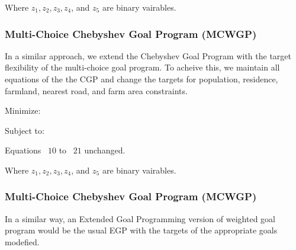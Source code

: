 Where $ z_1, z_2, z_3, z_4$, and $z_5$ are binary vairables.

\subsubsection{Multi-Choice Chebyshev Goal Program (MCWGP)}
In a similar approach, we extend the Chebyshev Goal Program with the target flexibility of the multi-choice goal program. To acheive this, we maintain all equations of the the CGP and change the targets for population, residence, farmland, nearest road, and farm area constraints.

Minimize:
              \EqCGPMinFunctionSix

Subject to:
                
              \EqMCWGPPopulationConstraintFourtyTwo   
              \EqMCWGPResidenceConstraintFourtyThree
              \EqMCWGPFarmlandDistanceConstraintFourtyFour
              \EqMCWGPNearestRoadConstraintFourtyFive
              \EqMCWGPFarmlandAreaConstraintFourtySix
              \begin{center}
                      Equations ~$10$ to ~$21$ unchanged.
              \end{center}
              \EqSelectThreeDamsTwentyTwo
              \EqBudgetConstraintTwentyThree
              \EqDConstraintOneNTwentyFour
              \EqDConstraintTwoNTwentyFive
              \EqDConstraintThreeNTwentySix
              \EqDConstraintFourNTwentySix
              \EqDConstraintFiveNTwentySeven
              \EqDConstraintSixNTwentyEight
              \EqDConstraintSevenNTwentyNine
              \EqDConstraintEightNThirty
              \EqDConstraintNineNThirtyOne
              \EqDConstraintTenNThirtyTwo

Where $ z_1, z_2, z_3, z_4$, and $z_5$ are binary vairables.

\subsubsection{Multi-Choice Chebyshev Goal Program (MCWGP)}
In a similar way, an Extended Goal Programming version of weighted goal program would be the usual EGP with the targets of the appropriate goals modefied.

